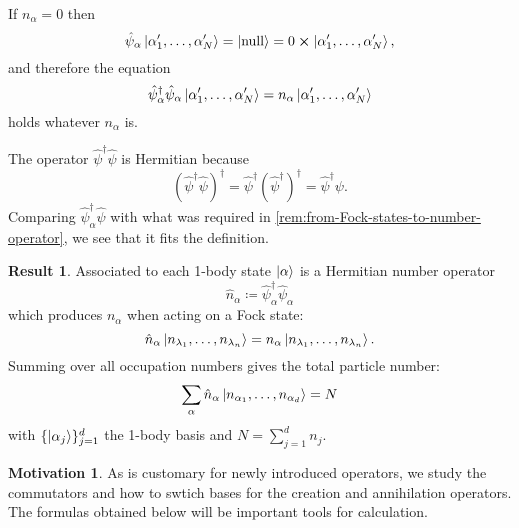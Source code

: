 \documentclass{article}
\theoremstyle{definition}
\newtheorem{res}{Result}[section]
\newtheorem{mot}{Motivation}[section]
\theoremstyle{plain}
\numberwithin{equation}{section}
\begin{document}
If $n_{\alpha}=0$ then 
\[
    \hat{\psi}_{\alpha}
    \ket{\alpha'_{1}, \ldots ,\alpha'_{N}}
    =
    \ket{\text{null}}
    =0 \cross \ket{\alpha'_{1}, \ldots ,\alpha'_{N}},
\]
and therefore the equation 
\[
    \hat{\psi}^{\dagger}_{\alpha}\hat{\psi}_{\alpha}
    \ket{\alpha'_{1}, \ldots ,\alpha'_{N}}
    =
    n_{\alpha}
    \ket{\alpha'_{1}, \ldots ,\alpha'_{N}}
\]
holds whatever $n_{\alpha}$ is. 

The operator $\hat{\psi}^{\dagger}\hat{\psi}$ is 
Hermitian because 
\[
    \left( \hat{\psi}^{\dagger}\hat{\psi} \right) ^{\dagger}
    =
    \hat{\psi}^{\dagger}
    \left( \hat{\psi}^{\dagger} \right) ^{\dagger}
    =
    \hat{\psi}^{\dagger}\psi.
\]
Comparing $\hat{\psi}^{\dagger}_{\alpha}\hat{\psi}$ with 
what was required 
in \cref{rem:from-Fock-states-to-number-operator}, 
we see that it fits the definition.

\begin{graybox}
\begin{res}
    Associated to each 1-body state $\ket{\alpha}$ 
    is a Hermitian number operator 
    \begin{equation}
        \hat{n}_{\alpha}\coloneqq
        \hat{\psi}^{\dagger}_{\alpha}\hat{\psi}_{\alpha}
    \label{eqn:definition-of-the-number-operator}
    \end{equation}
    which produces $n_{\alpha}$ when acting 
    on a Fock state: 
    \begin{equation}
        \hat{n}_{\alpha}
        \ket{n_{\lambda_1}, \ldots ,n_{\lambda_n}}
        =
        n_{\alpha}
        \ket{n_{\lambda_1}, \ldots ,n_{\lambda_n}}.
    \end{equation}
    Summing over all occupation numbers 
    gives the total particle number: 
    \begin{equation}
        \sum_{\alpha}
        \hat{n}_{\alpha}
        \ket{n_{\alpha_1}, \ldots ,n_{\alpha_{d}}}
        =
        N
    \end{equation}
    with $\{\ket{\alpha_{j}}\}_{j=1}^{d}$ 
    the 1-body basis and $N=\sum_{j=1}^{d}n_{j}$. 
\end{res}
\end{graybox}


\begin{mot}
As is customary for newly introduced operators, 
we study the commutators and how to swtich bases 
for the creation and annihilation operators. 
The formulas obtained below will be 
important tools for calculation.
\end{mot}
\end{document}
